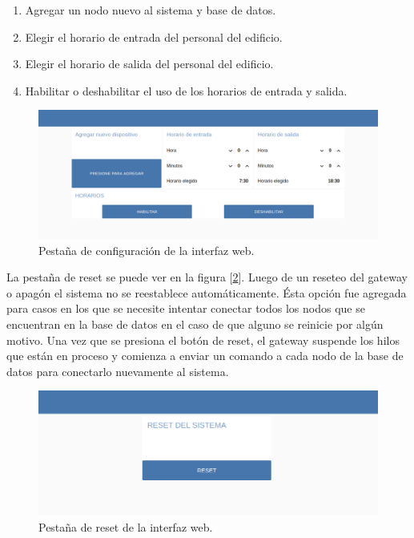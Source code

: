 \begin{enumerate}
\item Agregar un nodo nuevo al sistema y base de datos.
\item Elegir el horario de entrada del personal del edificio.
\item Elegir el horario de salida del personal del edificio.
\item Habilitar o deshabilitar el uso de los horarios de entrada y salida.
\end{enumerate}

\begin{figure}[h!]
	\centering
	\includegraphics[width=1\textwidth]{./Figures/configuracion.png}
	\caption{Pestaña de configuración de la interfaz web.}
	\label{fig:configuracion}
\end{figure}

La pestaña de reset se puede ver en la figura [\ref{fig:reset}]. Luego de un reseteo del gateway o apagón el sistema no se reestablece automáticamente. Ésta opción fue agregada para casos en los que se necesite intentar conectar todos los nodos que se encuentran en la base de datos en el caso de que alguno se reinicie por algún motivo. Una vez que se presiona el botón de reset, el gateway suspende los hilos que están en proceso y comienza a enviar un comando a cada nodo de la base de datos para conectarlo nuevamente al sistema.

\begin{figure}[t!]
	\centering
	\includegraphics[width=1\textwidth]{./Figures/reset.png}
	\caption{Pestaña de reset de la interfaz web.}
	\label{fig:reset}
\end{figure}
